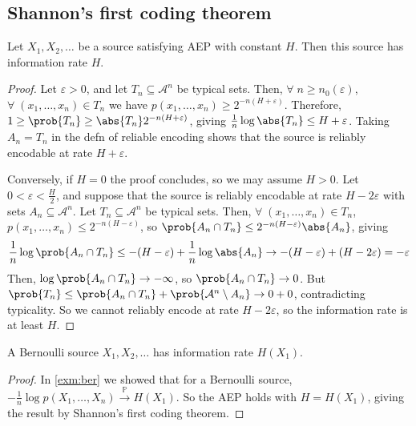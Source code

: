 \subsection{Shannon's first coding theorem}
\begin{theorem}
    Let $X_1, X_2, \dots$ be a source satisfying AEP with constant $H$.
    Then this source has information rate $H$.
\end{theorem}

\begin{proof}
    Let $\varepsilon > 0$, and let $T_n \subseteq \mathcal A^n$ be typical sets.
    Then, $\forall \; n \geq n_0(\varepsilon)$, $\forall \; (x_1, \dots, x_n) \in T_n$ we have $p(x_1, \dots, x_n) \geq 2^{-n(H + \varepsilon)}$.
    Therefore, $1 \geq \prob{T_n} \geq \abs{T_n} 2^{-n(H + \varepsilon)}$, giving $\frac{1}{n} \log \abs{T_n} \leq H + \varepsilon$.
    Taking $A_n = T_n$ in the defn of reliable encoding shows that the source is reliably encodable at rate $H + \varepsilon$.

    Conversely, if $H = 0$ the proof concludes, so we may assume $H > 0$.
    Let $0 < \varepsilon < \frac{H}{2}$, and suppose that the source is reliably encodable at rate $H - 2\varepsilon$ with sets $A_n \subseteq \mathcal A^n$.
    Let $T_n \subseteq \mathcal A^n$ be typical sets.
    Then, $\forall \; (x_1, \dots, x_n) \in T_n$, $p(x_1, \dots, x_n) \leq 2^{-n(H - \varepsilon)}$, so $\prob{A_n \cap T_n} \leq 2^{-n(H - \varepsilon)} \abs{A_n}$, giving
    \begin{align*}
        \frac{1}{n} \log \prob{A_n \cap T_n} \leq -(H - \varepsilon) + \frac{1}{n} \log \abs{A_n} \to -(H - \varepsilon) + (H - 2 \varepsilon) = -\varepsilon
    \end{align*}
    Then, $\log \prob{A_n \cap T_n} \to -\infty$, so $\prob{A_n \cap T_n} \to 0$.
    But $\prob{T_n} \leq \prob{A_n \cap T_n} + \prob{\mathcal A^n \setminus A_n} \to 0 + 0$, contradicting typicality.
    So we cannot reliably encode at rate $H - 2\varepsilon$, so the information rate is at least $H$.
\end{proof}

\begin{corollary}
    A Bernoulli source $X_1, X_2, \dots$ has information rate $H(X_1)$.
\end{corollary}

\begin{proof}
    In \cref{exm:ber} we showed that for a Bernoulli source, \\ $-\frac{1}{n} \log p(X_1, \dots, X_n) \xrightarrow{\mathbb P} H(X_1)$.
    So the AEP holds with $H = H(X_1)$, giving the result by Shannon's first coding theorem.
\end{proof}


